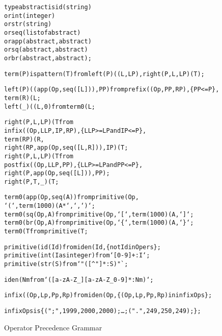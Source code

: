 \begin{program}
\begin{alltt}
type abstract is id(string)
  or int(integer)
  or str(string)
  or seq(list of abstract)
  or app(abstract,abstract)
  or sq(abstract,abstract)
  or br(abstract,abstract);

term(P) is pattern(T) from left(P)((L,LP), right(P,L,LP)(T);

left(P)((app(Op,seq([L])),PP) from prefix((Op,PP,RP), \{PP<=P\},
       term(R)(L;
left(_)((L,0) from term0(L;

right(P,L,LP)(T from 
       infix((Op,LLP,IP,RP), \{ LLP>=LP and IP<=P \},
       term(RP)(R,
       right(RP,app(Op,seq([L,R])),IP)(T;
right(P,L,LP)(T from    
       postfix((Op,LLP,PP), \{ LLP>=LP and PP<=P \},
       right(P,app(Op,seq([L])),PP);
right(P,T,_)(T;

term0(app(Op,seq(A)) from primitive(Op, 
       `(`, term(1000)(A * `,`, `)`;
term0(sq(Op,A) from primitive(Op, `[`, term(1000)(A, `]`;
term0(br(Op,A) from primitive(Op, `\{`, term(1000)(A, `\}`;
term0(T from primitive(T;

primitive(id(Id) from iden(Id, \{not Id in Opers\};
primitive(int(I as integer) from `[0-9]+:I`;
primitive(str(S) from `"([^"]*:S)"`;

iden(Nm from `([a-zA-Z_][a-zA-Z_0-9]*:Nm)`;

infix((Op,Lp,Pp,Rp) from iden(Op, \{(Op,Lp,Pp,Rp) in infixOps \};

infixOps is \{ (";",1999,2000,2000); \ldots; (".",249,250,249); \};
\end{alltt}
\vspace{-2ex}
\caption{Operator Precedence Grammar}\label{srOpPrecGrammar}
\end{program}